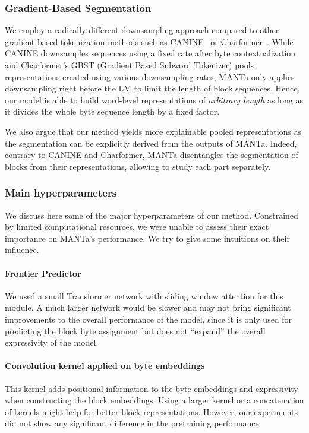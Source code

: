 \subsubsection{Gradient-Based Segmentation}

We employ a radically different downsampling approach compared to other gradient-based tokenization methods such as CANINE~\cite{clark2022canine} or Charformer~\cite{tay2021charformer}. While CANINE downsamples sequences using a fixed rate after byte contextualization and Charformer's GBST (Gradient Based Subword Tokenizer) pools representations created using various downsampling rates, MANTa only applies downsampling right before the LM to limit the length of block sequences. Hence, our model is able to build word-level representations of \textit{arbitrary length} as long as it divides the whole byte sequence length by a fixed factor.

We also argue that our method yields more explainable pooled representations as the segmentation can be explicitly derived from the outputs of MANTa. Indeed, contrary to CANINE and Charformer, MANTa disentangles the segmentation of blocks from their representations, allowing to study each part separately.

\subsubsection{Main hyperparameters}
We discuss here some of the major hyperparameters of our method. Constrained by limited computational resources, we were unable to assess their exact importance on MANTa's performance. We try to give some intuitions on their influence.

\paragraph{Frontier Predictor} We used a small Transformer network with sliding window attention for this module. A much larger network would be slower and may not bring significant improvements to the overall performance of the model, since it is only used for predicting the block byte assignment but does not ``expand'' the overall expressivity of the model.

\paragraph{Convolution kernel applied on byte embeddings} This kernel adds positional information to the byte embeddings and expressivity when constructing the block embeddings. Using a larger kernel or a concatenation of kernels might help for better block representations. However, our experiments did not show any significant difference in the pretraining performance.

